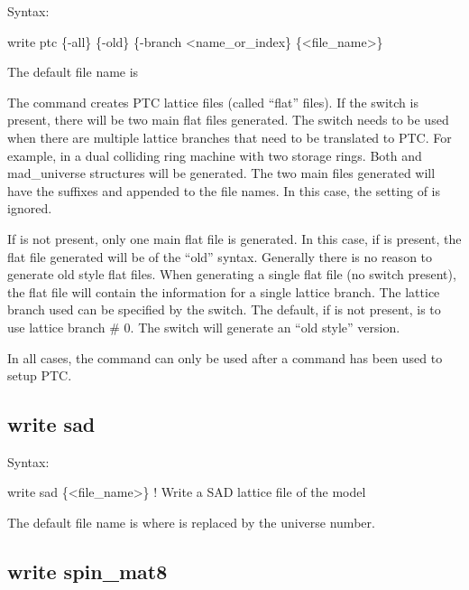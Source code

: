 {{{{{{{{{{{Syntax:
\begin{example}
  write ptc \{-all\} \{-old\} \{-branch <name_or_index\} \{<file_name>\}
\end{example}

The default file name is 

The  command creates PTC lattice files (called ``flat'' files).  If the 
switch is present, there will be two main flat files generated. The  switch needs to be
used when there are multiple lattice branches that need to be translated to PTC. For example, in a
dual colliding ring machine with two storage rings. Both  and  mad_universe
structures will be generated. The two main files generated will have the suffixes  and
 appended to the file names. In this case, the setting of  is ignored.

If  is not present, only one main flat file is generated. In this case, if  is
present, the flat file generated will be of the ``old'' syntax. Generally there is no reason to
generate old style flat files. When generating a single flat file (no  switch present), the
flat file will contain the information for a single lattice branch. The lattice branch used can be
specified by the  switch. The default, if  is not present, is to use lattice
branch \# 0. The  switch will generate an ``old style'' version.

In all cases, the  command can only be used after a  command has been
used to setup PTC.


\subsection{write sad}
\label{s:write.sad}

Syntax:
\begin{example}
  write sad \{<file_name>\}  ! Write a SAD lattice file of the model
\end{example}

The default file name is  where \vn{\#} is replaced by the universe number. 


\subsection{write spin_mat8}
\label{s:write.spin.mat8}

}}}}}}}}}}}
